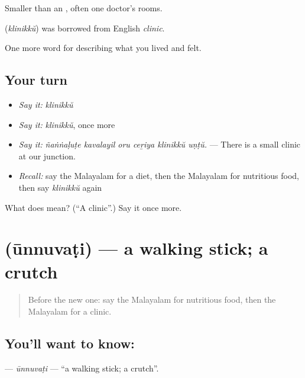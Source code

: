 Smaller than an , often one doctor's rooms.

\begin{cousinweb}
\textbf{} (\emph{klinikkŭ}) was borrowed from English \emph{clinic}.
\end{cousinweb}

\begin{grammarlens}[title={What you've built}]
One more word for describing what you lived and felt.
\end{grammarlens}

\subsection*{Your turn}
\begin{itemize}
\raggedright
  \item \emph{Say it:} \emph{klinikkŭ}
  \item \emph{Say it:} \emph{klinikkŭ}, once more
  \item \emph{Say it:} \emph{ñaṅṅaḷuṭe kavalayil oru ceṟiya klinikkŭ uṇṭŭ.} — There is a small clinic at our junction.
  \item \emph{Recall:} say the Malayalam for a diet, then the Malayalam for nutritious food, then say \emph{klinikkŭ} again
\end{itemize}

\begin{tcolorbox}[breakable,colback=teal!4,colframe=teal!35!black,title={Before you move on}]
What does  mean? (\textquotedblleft{}A clinic\textquotedblright{}.) Say it once more.
\end{tcolorbox}
\section[\texorpdfstring{\ml{ഊന്നുവടി} (ūnnuvaṭi)}{ഊന്നുവടി (ūnnuvaṭi)}]{ (ūnnuvaṭi) — a walking stick; a crutch}

\label{lesson:ML-C540-unnuvati}



\begin{quote}
Before the new one: say the Malayalam for nutritious food, then the Malayalam for a clinic.
\end{quote}

\subsection*{You'll want to know: }
\textbf{} — \emph{ūnnuvaṭi} — \textquotedblleft{}a walking stick; a crutch\textquotedblright{}.

